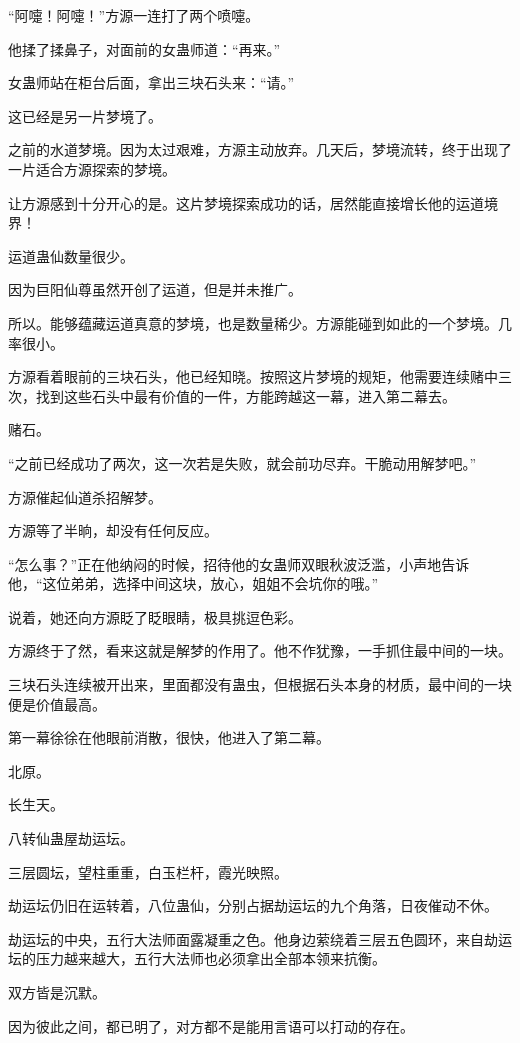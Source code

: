 \begin{this_body}
“阿嚏！阿嚏！”方源一连打了两个喷嚏。

他揉了揉鼻子，对面前的女蛊师道：“再来。”

女蛊师站在柜台后面，拿出三块石头来：“请。”

这已经是另一片梦境了。

之前的水道梦境。因为太过艰难，方源主动放弃。几天后，梦境流转，终于出现了一片适合方源探索的梦境。

让方源感到十分开心的是。这片梦境探索成功的话，居然能直接增长他的运道境界！

运道蛊仙数量很少。

因为巨阳仙尊虽然开创了运道，但是并未推广。

所以。能够蕴藏运道真意的梦境，也是数量稀少。方源能碰到如此的一个梦境。几率很小。

方源看着眼前的三块石头，他已经知晓。按照这片梦境的规矩，他需要连续赌中三次，找到这些石头中最有价值的一件，方能跨越这一幕，进入第二幕去。

赌石。

“之前已经成功了两次，这一次若是失败，就会前功尽弃。干脆动用解梦吧。”

方源催起仙道杀招解梦。

方源等了半晌，却没有任何反应。

“怎么事？”正在他纳闷的时候，招待他的女蛊师双眼秋波泛滥，小声地告诉他，“这位弟弟，选择中间这块，放心，姐姐不会坑你的哦。”

说着，她还向方源眨了眨眼睛，极具挑逗色彩。

方源终于了然，看来这就是解梦的作用了。他不作犹豫，一手抓住最中间的一块。

三块石头连续被开出来，里面都没有蛊虫，但根据石头本身的材质，最中间的一块便是价值最高。

第一幕徐徐在他眼前消散，很快，他进入了第二幕。

北原。

长生天。

八转仙蛊屋劫运坛。

三层圆坛，望柱重重，白玉栏杆，霞光映照。

劫运坛仍旧在运转着，八位蛊仙，分别占据劫运坛的九个角落，日夜催动不休。

劫运坛的中央，五行大法师面露凝重之色。他身边萦绕着三层五色圆环，来自劫运坛的压力越来越大，五行大法师也必须拿出全部本领来抗衡。

双方皆是沉默。

因为彼此之间，都已明了，对方都不是能用言语可以打动的存在。


\end{this_body}
